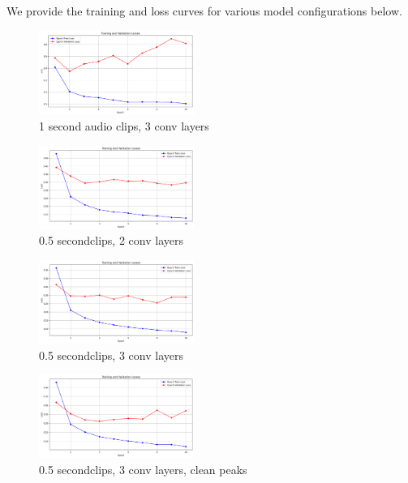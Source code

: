 \documentclass[twocolumn]{article}
\begin{document}
We provide the training and loss curves for various model configurations below.
\begin{figure}
\centering
\includegraphics[width=0.45\textwidth]{figures/loss_plot_1s_3conv.png}
\caption{1 second audio clips, 3 conv layers}
\label{fig:1s_3conf}
\end{figure}

\begin{figure}
\centering
\includegraphics[width=0.45\textwidth]{figures/loss_plot_halfs_2conv.png}
\caption{0.5 secondclips, 2 conv layers}
\label{fig:halfs_2conv}
\end{figure}

\begin{figure}
\centering
\includegraphics[width=0.45\textwidth]{figures/loss_plot_halfs_3conv.png}
\caption{0.5 secondclips, 3 conv layers}
\label{fig:halfs_3conv}
\end{figure}

\begin{figure}
\centering
\includegraphics[width=0.45\textwidth]{figures/loss_plot_halfs_3conv_cleanpeaks.png}
\caption{0.5 secondclips, 3 conv layers, clean peaks}
\label{fig:halfs_3conv_cleanpeaks}
\end{figure}
\end{document}
